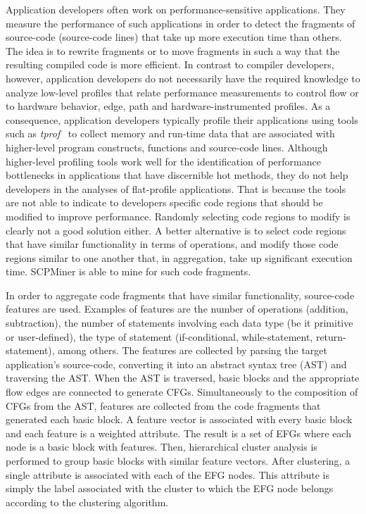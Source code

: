 Application developers often work on performance-sensitive applications. They measure the performance of such applications in order to detect the fragments of source-code (\eg source-code lines) that take up more execution time than others. The idea is to rewrite fragments or to move fragments in such a way that the resulting compiled code is more efficient. In contrast to compiler developers, however, application developers do not necessarily have the required knowledge to analyze low-level profiles that relate performance measurements to control flow or to hardware behavior, \ie edge, path and hardware-instrumented profiles. As a consequence, application developers typically profile their applications using tools such as \emph{tprof}~\cite{TProf} to collect memory and run-time data that are associated with higher-level program constructs, \eg functions and source-code lines. Although higher-level profiling tools work well for the identification of performance bottlenecks in applications that have discernible hot methods, they do not help developers in the analyses of flat-profile applications. That is because the tools are not able to indicate to developers specific code regions that should be modified to improve performance. Randomly selecting code regions to modify is clearly not a good solution either. A better alternative is to select code regions that have similar functionality in terms of operations, and modify those code regions similar to one another that, in aggregation, take up significant execution time. SCPMiner is able to mine for such code fragments.

In order to aggregate code fragments that have similar functionality, source-code features are used. Examples of features are the number of operations (\eg addition, subtraction), the number of statements involving each data type (be it primitive or user-defined), the type of statement (\eg if-conditional, while-statement, return-statement), among others. The features are collected by parsing the target application's source-code, converting it into an abstract syntax tree (AST) and traversing the AST. When the AST is traversed, basic blocks and the appropriate flow edges are connected to generate CFGs. Simultaneously to the composition of CFGs from the AST, features are collected from the code fragments that generated each basic block. A feature vector is associated with every basic block and each feature is a weighted attribute. The result is a set of EFGs where each node is a basic block with features. Then, hierarchical cluster analysis is performed to group basic blocks with similar feature vectors. After clustering, a single attribute is associated with each of the EFG nodes. This attribute is simply the label associated with the cluster to which the EFG node belongs according to the clustering algorithm. 

